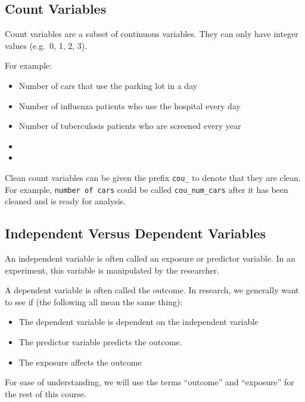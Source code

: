 \documentclass[12pt,]{article}
\providecommand{\tightlist}{%
  \setlength{\itemsep}{0pt}\setlength{\parskip}{0pt}}
\begin{document}
\subsection{Count Variables}\label{count-variables}

Count variables are a subset of continuous variables. They can only have
integer values (e.g.~0, 1, 2, 3).

For example:

\begin{itemize}
\tightlist
\item
  Number of cars that use the parking lot in a day
\item
  Number of influenza patients who use the hospital every day
\item
  Number of tuberculosis patients who are screened every year
\item
  \hfill \break
  \hfill \break
\item
  \hfill \break
  \hfill \break
\end{itemize}

Clean count variables can be given the prefix \texttt{cou\_} to denote
that they are clean. For example, \texttt{number\ of\ cars} could be
called \texttt{cou\_num\_cars} after it has been cleaned and is ready
for analysis.

\subsection{Independent Versus Dependent
Variables}\label{independent-versus-dependent-variables}

An independent variable is often called an exposure or predictor
variable. In an experiment, this variable is manipulated by the
researcher.

A dependent variable is often called the outcome. In research, we
generally want to see if (the following all mean the same thing):

\begin{itemize}
\tightlist
\item
  The dependent variable is dependent on the independent variable
\item
  The predictor variable predicts the outcome.
\item
  The exposure affects the outcome
\end{itemize}

For ease of understanding, we will use the terms ``outcome'' and
``exposure'' for the rest of this course.
\end{document}
